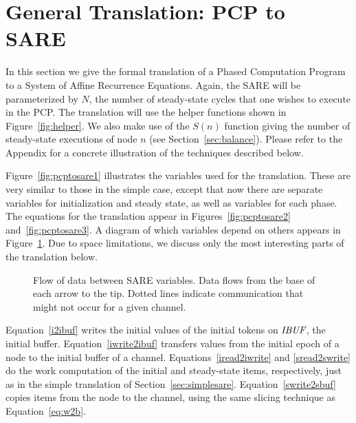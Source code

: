 \section{General Translation: PCP to SARE}
\label{sec:translate}

In this section we give the formal translation of a Phased Computation
Program to a System of Affine Recurrence Equations.  Again, the SARE
will be parameterized by $N$, the number of steady-state cycles that
one wishes to execute in the PCP.  The translation will use the helper
functions shown in Figure~\ref{fig:helper}.  We also make use of the
$S(n)$ function giving the number of steady-state executions of node
$n$ (see Section~\ref{sec:balance}).  Please refer to the Appendix for
a concrete illustration of the techniques described below.



Figure~\ref{fig:pcptosare1} illustrates the variables used for the
translation.  These are very similar to those in the simple case,
except that now there are separate variables for initialization and
steady state, as well as variables for each phase.  The equations for
the translation appear in Figures~\ref{fig:pcptosare2}
and~\ref{fig:pcptosare3}.  A diagram of which variables depend on
others appears in Figure~\ref{fig:communic}.  Due to space
limitations, we discuss only the most interesting parts of the
translation below.

\begin{figure}[t]
\centering
{}
\parbox{4in}{\caption{Flow of data between SARE variables.  Data flows from the base of each arrow to the tip.  Dotted lines indicate communication that might not occur for a given channel.}
\protect\label{fig:communic}}
\end{figure}

Equation~\ref{i2ibuf} writes the initial values of the initial tokens
on $\mbox{\it IBUF}$, the initial buffer.  Equation~\ref{iwrite2ibuf}
transfers values from the initial epoch of a node to the initial
buffer of a channel.  Equations~\ref{iread2iwrite} and
\ref{sread2swrite} do the work computation of the initial and
steady-state items, respectively, just as in the simple translation of
Section~\ref{sec:simplesare}.  Equation~\ref{swrite2sbuf} copies items
from the node to the channel, using the same slicing technique as
Equation~\ref{eq:w2b}.

